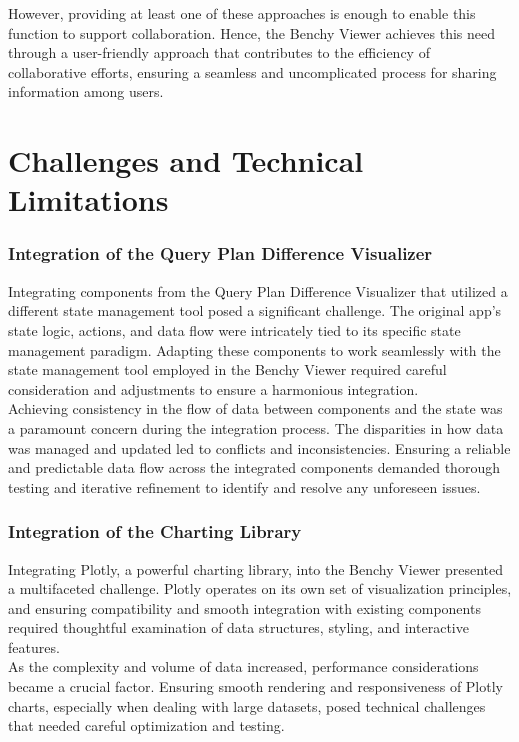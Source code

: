 However, providing at least one of these approaches is enough to enable this function to support collaboration. Hence, the Benchy Viewer achieves this need through a user-friendly approach that contributes to the efficiency of collaborative efforts, ensuring a seamless and uncomplicated process for sharing information among users.
  

\section{Challenges and Technical Limitations}

\subsubsection*{Integration of the Query Plan Difference Visualizer}
Integrating components from the Query Plan Difference Visualizer that utilized a different state management tool posed a significant challenge. The original app's state logic, actions, and data flow were intricately tied to its specific state management paradigm. Adapting these components to work seamlessly with the state management tool employed in the Benchy Viewer required careful consideration and adjustments to ensure a harmonious integration.\\
Achieving consistency in the flow of data between components and the state was a paramount concern during the integration process. The disparities in how data was managed and updated led to conflicts and inconsistencies. Ensuring a reliable and predictable data flow across the integrated components demanded thorough testing and iterative refinement to identify and resolve any unforeseen issues.

\subsubsection*{Integration of the Charting Library}

Integrating Plotly, a powerful charting library, into the Benchy Viewer presented a multifaceted challenge. Plotly operates on its own set of visualization principles, and ensuring compatibility and smooth integration with existing components required thoughtful examination of data structures, styling, and interactive features.\\
As the complexity and volume of data increased, performance considerations became a crucial factor. Ensuring smooth rendering and responsiveness of Plotly charts, especially when dealing with large datasets, posed technical challenges that needed careful optimization and testing. 

